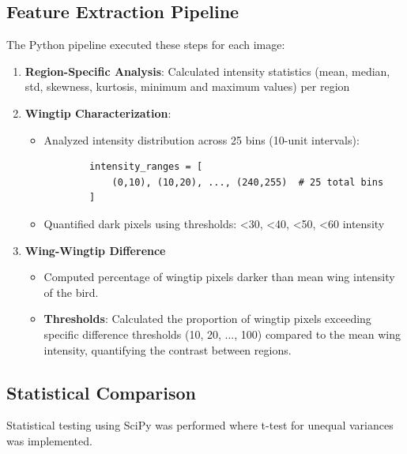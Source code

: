 \documentclass[a4paper,12pt]{report}
\begin{document}
\subsection{Feature Extraction Pipeline}
The Python pipeline executed these steps for each image:
\begin{enumerate}
    \item \textbf{Region-Specific Analysis}: Calculated intensity statistics (mean, median, std, skewness, kurtosis, minimum and maximum values) per region
 
    \item \textbf{Wingtip Characterization}:
    \begin{itemize}
        \item Analyzed intensity distribution across 25 bins (10-unit intervals):
        \begin{verbatim}
        intensity_ranges = [
            (0,10), (10,20), ..., (240,255)  # 25 total bins
        ]
        \end{verbatim}
        \item Quantified dark pixels using thresholds: <30, <40, <50, <60 intensity
    \end{itemize}
    \item \textbf{Wing-Wingtip Difference}
    \begin{itemize}
        \item Computed percentage of wingtip pixels darker than mean wing intensity of the bird.
        \item \textbf{Thresholds}: Calculated the proportion of wingtip pixels exceeding specific difference thresholds (10, 20, ..., 100) compared to the mean wing intensity, quantifying the contrast between regions.
    \end{itemize}
\end{enumerate}

\subsection{Statistical Comparison}
Statistical testing using SciPy was performed where t-test for unequal variances was implemented.


\end{document}
